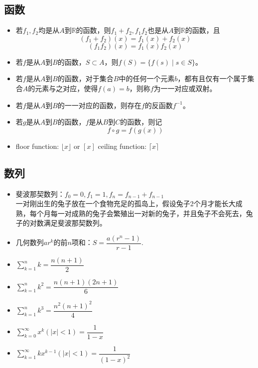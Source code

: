 
\subsection{函数}
\begin{itemize}
    \item 若$f_1, f_2$均是从$A$到$\mathbb{R}$的函数，则$f_1 + f_2, f_1 f_2$也是从$A$到$\mathbb{R}$的函数，且\[ (f_1 + f_2)(x) = f_1(x) + f_2(x) \] \[ (f_1 f_2)(x) = f_1(x) f_2(x) \]
    \item 若$f$是从$A$到$B$的函数，$S \subset A$，则$f(S) = \{f(s) \mid s \in S\}$。
    \item 若$f$是从$A$到$B$的函数，对于集合$B$中的任何一个元素$b$，都有且仅有一个属于集合$A$的元素与之对应，使得$f(a) = b$，则称$f$为一一对应或双射。
    \item 若$f$是从$A$到$B$的一一对应的函数，则存在$f$的反函数$f^{-1}$。
    \item 若$g$是从$A$到$B$的函数，$f$是从$B$到$C$的函数，则记\[ f \circ g = f(g(x))\]
    \item floor function: $\lfloor x \rfloor \text{ or } [x]$ \quad ceiling function: $\lceil x \rceil$
\end{itemize}

\subsection{数列}
\begin{itemize}
    \item 斐波那契数列：$f_0 = 0, f_1 = 1, f_n = f_{n-1} + f_{n-1}$ \\
    一对刚出生的兔子放在一个食物充足的孤岛上，假设兔子2个月才能长大成熟，每个月每一对成熟的兔子会繁殖出一对新的兔子，并且兔子不会死去，兔子的对数满足斐波那契数列。
    \item 几何数列$ar^k$的前$n$项和：$S = \dfrac{a(r^n-1)}{r-1}$.
    \item $\displaystyle \sum _{k=1}^n k = \dfrac{n(n+1)}{2}$
    \item $\displaystyle \sum _{k=1}^n k^2 = \dfrac{n(n+1)(2n+1)}{6}$
    \item $\displaystyle \sum _{k=1}^n k^3 = \dfrac{n^2 (n+1)^2}{4}$
    \item $\displaystyle \sum _{k=0}^\infty x^k (\lvert x \rvert < 1) = \dfrac{1}{1-x}$
    \item $\displaystyle \sum _{k=1}^\infty kx^{k-1} (\lvert x \rvert < 1) = \dfrac{1}{(1-x)^2}$
\end{itemize}

